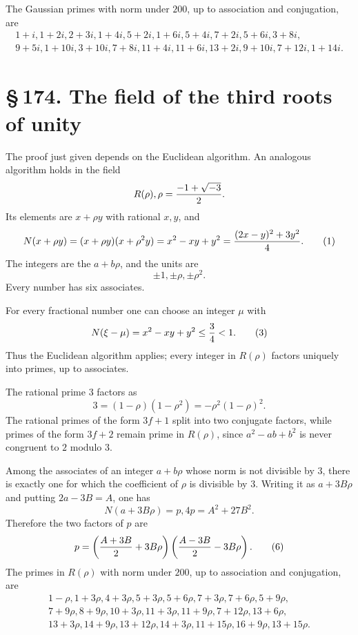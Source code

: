 \documentclass[11pt]{article}
\providecommand{\sect}[2]{\section*{\S\,#1. #2}}
\begin{document}
The Gaussian primes with norm under $200$, up to association and conjugation, are
\[
\begin{gathered}
1+i,
1+2i,
2+3i,
1+4i,
5+2i,
1+6i,
5+4i,
7+2i,
5+6i,
3+8i,\\
9+5i,
1+10i,
3+10i,
7+8i,
11+4i,
11+6i,
13+2i,
9+10i,
7+12i,
1+14i.
\end{gathered}
\]

\sect{174}{The field of the third roots of unity}

The proof just given depends on the Euclidean algorithm. An analogous algorithm holds in the field
\[
        R(\rho),
        \rho={-1+\sqrt{-3}\over2}.
\]
Its elements are $x+\rho y$ with rational $x,y$, and
\[
        N(x+
\rho y)=(x+
\rho y)(x+
\rho^2y)=x^2-xy+y^2
        ={(2x-y)^2+3y^2\over4}.                                      \tag{1}
\]
The integers are the $a+b\rho$, and the units are
\[
        \pm1,
        \pm\rho,
        \pm\rho^2.                                                     \tag{2}
\]
Every number has six associates.

For every fractional number one can choose an integer $\mu$ with
\[
        N(\xi-
\mu)=x^2-xy+y^2\le {3\over4}<1.                           \tag{3}
\]
Thus the Euclidean algorithm applies; every integer in $R(\rho)$ factors uniquely into primes, up to associates.

The rational prime $3$ factors as
\[
        3=(1-
\rho)(1-
\rho^2)=-\rho^2(1-
\rho)^2.                         \tag{4}
\]
The rational primes of the form $3f+1$ split into two conjugate factors, while primes of the form $3f+2$ remain prime in $R(\rho)$, since $a^2-ab+b^2$ is never congruent to $2$ modulo $3$.

Among the associates of an integer $a+b\rho$ whose norm is not divisible by $3$, there is exactly one for which the coefficient of $\rho$ is divisible by $3$. Writing it as $a+3B\rho$ and putting $2a-3B=A$, one has
\[
        N(a+3B\rho)=p,
        4p=A^2+27B^2.                                                  \tag{5}
\]
Therefore the two factors of $p$ are
\[
        p=\left({A+3B\over2}+3B\rho\right)
          \left({A-3B\over2}-3B\rho\right).                            \tag{6}
\]
The primes in $R(\rho)$ with norm under $200$, up to association and conjugation, are
\[
\begin{gathered}
1-
\rho,
1+3\rho,
4+3\rho,
5+3\rho,
5+6\rho,
7+3\rho,
7+6\rho,
5+9\rho,\\
7+9\rho,
8+9\rho,
10+3\rho,
11+3\rho,
11+9\rho,
7+12\rho,
13+6\rho,\\
13+3\rho,
14+9\rho,
13+12\rho,
14+3\rho,
11+15\rho,
16+9\rho,
13+15\rho.
\end{gathered}
\]
\end{document}
